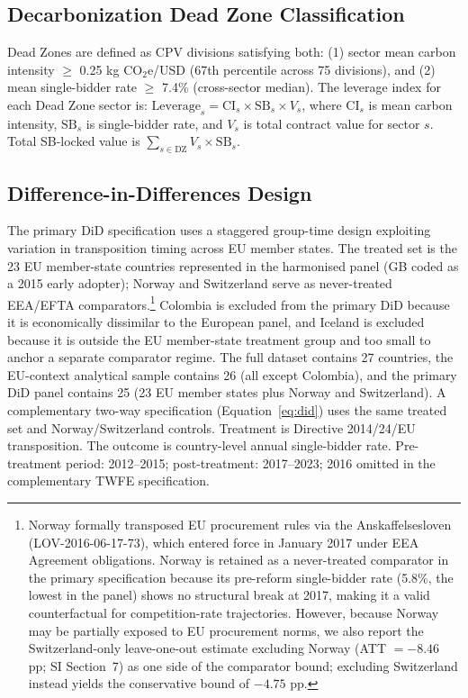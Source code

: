 \documentclass[11pt,a4paper]{article}
\begin{document}
\subsection{Decarbonization Dead Zone Classification}

Dead Zones are defined as CPV divisions satisfying both: (1) sector mean carbon intensity $\geq$ 0.25 kg CO$_2$e/USD (67th percentile across 75 divisions), and (2) mean single-bidder rate $\geq$ 7.4\% (cross-sector median). The leverage index for each Dead Zone sector is: $\text{Leverage}_s = \text{CI}_s \times \text{SB}_s \times V_s$, where $\text{CI}_s$ is mean carbon intensity, $\text{SB}_s$ is single-bidder rate, and $V_s$ is total contract value for sector $s$. Total SB-locked value is $\sum_{s \in \text{DZ}} V_s \times \text{SB}_s$.

\subsection{Difference-in-Differences Design}

The primary DiD specification uses a staggered group-time design\cite{callaway2021difference} exploiting variation in transposition timing across EU member states. The treated set is the 23 EU member-state countries represented in the harmonised panel (GB coded as a 2015 early adopter); Norway and Switzerland serve as never-treated EEA/EFTA comparators.\footnote{Norway formally transposed EU procurement rules via the Anskaffelsesloven (LOV-2016-06-17-73), which entered force in January 2017 under EEA Agreement obligations. Norway is retained as a never-treated comparator in the primary specification because its pre-reform single-bidder rate (5.8\%, the lowest in the panel) shows no structural break at 2017, making it a valid counterfactual for competition-rate trajectories. However, because Norway may be partially exposed to EU procurement norms, we also report the Switzerland-only leave-one-out estimate excluding Norway (ATT $= -8.46$ pp; SI Section~7) as one side of the comparator bound; excluding Switzerland instead yields the conservative bound of $-4.75$ pp.} Colombia is excluded from the primary DiD because it is economically dissimilar to the European panel, and Iceland is excluded because it is outside the EU member-state treatment group and too small to anchor a separate comparator regime. The full dataset contains 27 countries, the EU-context analytical sample contains 26 (all except Colombia), and the primary DiD panel contains 25 (23 EU member states plus Norway and Switzerland). A complementary two-way specification (Equation~\ref{eq:did}) uses the same treated set and Norway/Switzerland controls. Treatment is Directive 2014/24/EU transposition. The outcome is country-level annual single-bidder rate. Pre-treatment period: 2012--2015; post-treatment: 2017--2023; 2016 omitted in the complementary TWFE specification.
\end{document}
